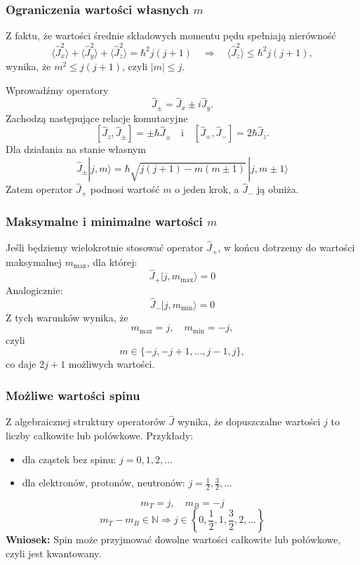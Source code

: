 \subsubsection*{Ograniczenia wartości własnych $m$}
Z faktu, że wartości średnie składowych momentu pędu spełniają nierówność
$$
\langle \hat{J}_x^2 \rangle + \langle \hat{J}_y^2 \rangle + \langle \hat{J}_z^2 \rangle = \hbar^2 j(j+1)
\quad \Rightarrow \quad \langle \hat{J}_z^2 \rangle \leq \hbar^2 j(j+1),
$$
wynika, że $m^2 \leq j(j+1)$, czyli $|m| \leq j$.

Wprowadźmy operatory
$$
\hat{J}_\pm = \hat{J}_x \pm i\hat{J}_y.
$$
Zachodzą następujące relacje komutacyjne
$$
[\hat{J}_z, \hat{J}_\pm] = \pm \hbar \hat{J}_\pm
\quad \text{i} \quad
[\hat{J}_+, \hat{J}_-] = 2\hbar \hat{J}_z.
$$
Dla działania na stanie własnym
$$
\hat{J}_\pm |j, m\rangle = \hbar \sqrt{j(j+1) - m(m \pm 1)} \, |j, m \pm 1\rangle
$$
Zatem operator $\hat{J}_+$ podnosi wartość $m$ o jeden krok, a $\hat{J}_-$ ją obniża.

\subsubsection*{Maksymalne i minimalne wartości $m$}
Jeśli będziemy wielokrotnie stosować operator $\hat{J}_+$, w końcu dotrzemy do wartości maksymalnej $m_{\text{max}}$, dla której:
$$
\hat{J}_+ |j, m_{\text{max}}\rangle = 0
$$
Analogicznie:
$$
\hat{J}_- |j, m_{\text{min}}\rangle = 0
$$
Z tych warunków wynika, że
$$
m_{\text{max}} = j, \quad m_{\text{min}} = -j,
$$
czyli
$$
m \in \{-j, -j+1, ..., j-1, j\},
$$
co daje $2j + 1$ możliwych wartości.

\subsubsection*{Możliwe wartości spinu}
Z algebraicznej struktury operatorów $\hat{J}$ wynika, że dopuszczalne wartości $j$ to liczby całkowite lub połówkowe. Przykłady:
\begin{itemize}
\item dla cząstek bez spinu: $j = 0, 1, 2, \dots$
\item dla elektronów, protonów, neutronów: $j = \tfrac{1}{2}, \tfrac{3}{2}, \dots$
\end{itemize}
$$
m_T = j, \quad m_B = -j
$$
$$
m_T - m_B \in \mathbb{N} \Rightarrow j \in \left\{0, \frac{1}{2}, 1, \frac{3}{2}, 2, \dots \right\}
$$
\textbf{Wniosek:} Spin może przyjmować dowolne wartości całkowite lub połówkowe, czyli jest kwantowany.

